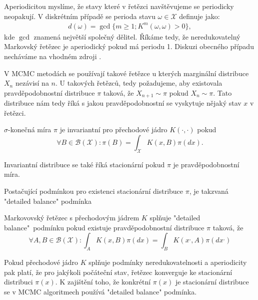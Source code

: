 \documentclass[czech,master,public,dept470,male,cpdeclaration,oneside, python]{diploma}
\begin{document}
Aperiodicitou myslíme, že stavy které v řetězci navštěvujeme se periodicky neopakují. V diskrétním případě se perioda stavu $\omega \in \mathcal{X}$ definuje jako:
\begin{align}\nonumber
	d(\omega) = \gcd \{m \geq 1; K^m(\omega, \omega) > 0\},
\end{align}
kde $\gcd$ znamená největší společný dělitel. Říkáme tedy, že neredukovatelný Markovský řetězec je aperiodický pokud má periodu 1. Diskuzi obecného případu necháváme na vhodném zdroji \cite{robert2004monte}. \par

V MCMC metodách se používají takové řetězce u kterých marginální distribuce $X_n$ nezávisí na $n$. U takových řetězců, tedy požadujeme, aby existovala pravděpodobnostní distribuce $\pi$ taková, že $X_{n+1} \sim \pi$ pokud $X_n \sim \pi$. Tato distribuce nám tedy říká s jakou pravděpodobnostní se vyskytuje nějaký stav $x$ v řetězci. 

\begin{definition}
	$\sigma$-konečná míra $\pi$ je invariantní pro přechodové jádro $K(\cdot, \cdot)$ pokud
	\begin{equation*}
	\forall B \in \mathcal{B}(\mathcal{X}):	\pi(B) = \int_{\mathcal{X}} K(x, B)\pi(dx) .
	\end{equation*}
\end{definition}
Invariantní distribuce se také říká stacionární pokud $\pi$ je pravděpodobnostní míra. \par 
Postačující podmínkou pro existenci stacionární distribuce $\pi$, je takzvaná "detailed balance" podmínka
\begin{definition}\label{detailed_balanced}
	Markovovský řetězec s přechodovým jádrem $K$ splňuje "detailed balance"\ podmínku pokud existuje pravděpodobnostní distribuce $\pi$ taková, že
	\begin{equation*}
	\forall A,B \in \mathcal{B}(\mathcal{X}):	\int_A K(x, B)\pi(dx) = \int_B K(x^{,}, A)\pi(dx^{,}) 
	\end{equation*}
\end{definition}
Pokud přechodové jádro $K$ splňuje podmínky neredukovatelnosti a aperiodicity pak platí, že pro jakýkoli počáteční stav, řetězec konverguje ke stacionární distribuci $\pi(x)$. K zajištění toho, že konkrétní $\pi(x)$ je stacionární distribuce se v MCMC algoritmech používá "detailed balance" podmínka.
\end{document}
